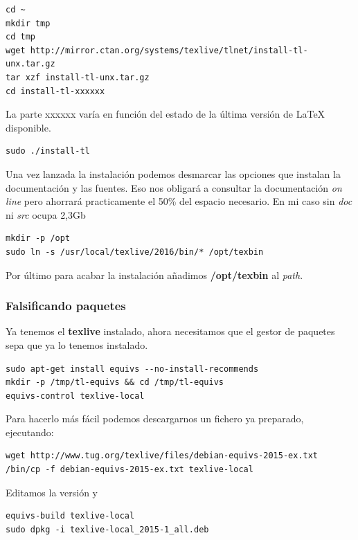 \documentclass[12pt,spanish,]{scrartcl}
\begin{document}
\begin{verbatim}
cd ~
mkdir tmp
cd tmp
wget http://mirror.ctan.org/systems/texlive/tlnet/install-tl-unx.tar.gz
tar xzf install-tl-unx.tar.gz
cd install-tl-xxxxxx
\end{verbatim}

La parte xxxxxx varía en función del estado de la última versión de
LaTeX disponible.

\begin{verbatim}
sudo ./install-tl
\end{verbatim}

Una vez lanzada la instalación podemos desmarcar las opciones que
instalan la documentación y las fuentes. Eso nos obligará a consultar la
documentación \emph{on line} pero ahorrará practicamente el 50\% del
espacio necesario. En mi caso sin \emph{doc} ni \emph{src} ocupa 2,3Gb

\begin{verbatim}
mkdir -p /opt
sudo ln -s /usr/local/texlive/2016/bin/* /opt/texbin
\end{verbatim}

Por último para acabar la instalación añadimos \textbf{/opt/texbin} al
\emph{path}.

\subsubsection{Falsificando paquetes}\label{falsificando-paquetes}

Ya tenemos el \textbf{texlive} instalado, ahora necesitamos que el
gestor de paquetes sepa que ya lo tenemos instalado.

\begin{verbatim}
sudo apt-get install equivs --no-install-recommends
mkdir -p /tmp/tl-equivs && cd /tmp/tl-equivs
equivs-control texlive-local
\end{verbatim}

Para hacerlo más fácil podemos descargarnos un fichero ya preparado,
ejecutando:

\begin{verbatim}
wget http://www.tug.org/texlive/files/debian-equivs-2015-ex.txt
/bin/cp -f debian-equivs-2015-ex.txt texlive-local
\end{verbatim}

Editamos la versión y

\begin{verbatim}
equivs-build texlive-local
sudo dpkg -i texlive-local_2015-1_all.deb
\end{verbatim}
\end{document}
